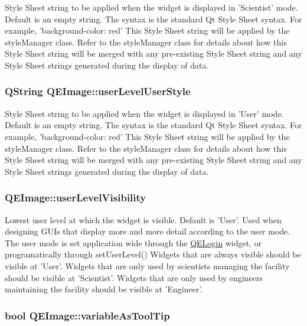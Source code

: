 Style Sheet string to be applied when the widget is displayed in 'Scientist' mode. Default is an empty string. The syntax is the standard Qt Style Sheet syntax. For example, 'background-\/color: red' This Style Sheet string will be applied by the styleManager class. Refer to the styleManager class for details about how this Style Sheet string will be merged with any pre-\/existing Style Sheet string and any Style Sheet strings generated during the display of data. \hypertarget{classQEImage_af5a40862b28b5abba789f4db44906dfc}{
\subsubsection[{userLevelUserStyle}]{\setlength{\rightskip}{0pt plus 5cm}QString QEImage::userLevelUserStyle}}
\label{classQEImage_af5a40862b28b5abba789f4db44906dfc}
Style Sheet string to be applied when the widget is displayed in 'User' mode. Default is an empty string. The syntax is the standard Qt Style Sheet syntax. For example, 'background-\/color: red' This Style Sheet string will be applied by the styleManager class. Refer to the styleManager class for details about how this Style Sheet string will be merged with any pre-\/existing Style Sheet string and any Style Sheet strings generated during the display of data. \hypertarget{classQEImage_a777c21b8780f53a99f930ca19dc5cbe5}{
\subsubsection[{userLevelVisibility}]{ QEImage::userLevelVisibility}}
\label{classQEImage_a777c21b8780f53a99f930ca19dc5cbe5}
Lowest user level at which the widget is visible. Default is 'User'. Used when designing GUIs that display more and more detail according to the user mode. The user mode is set application wide through the \hyperlink{classQELogin}{QELogin} widget, or programatically through setUserLevel() Widgets that are always visible should be visible at 'User'. Widgets that are only used by scientists managing the facility should be visible at 'Scientist'. Widgets that are only used by engineers maintaining the facility should be visible at 'Engineer'. \hypertarget{classQEImage_a6e3d7da4bcac6579ac582fe5c18ed405}{
\subsubsection[{variableAsToolTip}]{\setlength{\rightskip}{0pt plus 5cm}bool QEImage::variableAsToolTip}}
